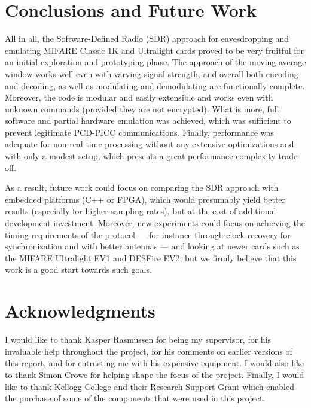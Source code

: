 \documentclass[fleqn,10pt]{SelfArx} %
\begin{document}
\section{Conclusions and Future Work}
\label{sec:conclusions}

All in all, the Software-Defined Radio (SDR) approach for eavesdropping and emulating MIFARE Classic 1K and Ultralight cards proved to be very fruitful for an initial exploration and prototyping phase. The approach of the moving average window works well even with varying signal strength, and overall both encoding and decoding, as well as modulating and demodulating are functionally complete. Moreover, the code is modular and easily extensible and works even with unknown commands (provided they are not encrypted). What is more, full software and partial hardware emulation was achieved, which was sufficient to prevent legitimate PCD-PICC communications. Finally, performance was adequate for non-real-time processing without any extensive optimizations and with only a modest setup, which presents a great performance-complexity trade-off.

As a result, future work could focus on comparing the SDR approach with embedded platforms (C++ or FPGA), which would presumably yield better results (especially for higher sampling rates), but at the cost of additional development investment. Moreover, new experiments could focus on achieving the timing requirements of the protocol --- for instance through clock recovery for synchronization and with better antennas --- and looking at newer cards such as the MIFARE Ultralight EV1 and DESFire EV2, but we firmly believe that this work is a good start towards such goals.


\section*{Acknowledgments} %

I would like to thank Kasper Rasmussen for being my supervisor, for his invaluable help throughout the project, for his comments on earlier versions of this report, and for entrusting me with his expensive equipment. I would also like to thank Simon Crowe for helping shape the focus of the project. Finally, I would like to thank Kellogg College and their Research Support Grant which enabled the purchase of some of the components that were used in this project.
\end{document}
